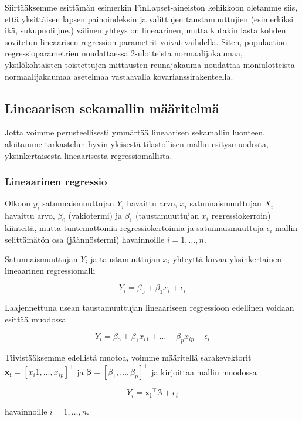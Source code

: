 \documentclass[finnish]{docopts}
\begin{document}
Siirtääksemme \cite{laird82} esittämän esimerkin FinLapset-aineiston kehikkoon oletamme siis, että yksittäisen lapsen painoindeksin ja valittujen taustamuuttujien (esimerkiksi ikä, sukupuoli jne.) välinen yhteys on lineaarinen, mutta kutakin lasta kohden sovitetun lineaarisen regression parametrit voivat vaihdella. Siten, populaation regressioparametrien noudattaessa 2-ulotteista normaalijakaumaa, yksilökohtaisten toistettujen mittausten reunajakauma noudattaa moniulotteista normaalijakaumaa asetelmaa vastaavalla kovarianssirakenteella. 

\subsection{Lineaarisen sekamallin määritelmä}
\label{sub:lsmmaar}

Jotta voimme perusteellisesti ymmärtää lineaarisen sekamallin luonteen, aloitamme tarkastelun hyvin yleisestä tilastollisen mallin esitysmuodosta, yksinkertaisesta lineaarisesta regressiomallista.

\subsubsection{Lineaarinen regressio}
\label{ssb:linreg}

Olkoon $y_i$ satunnaismuuttujan $Y_i$ havaittu arvo, $x_i$ satunnaismuuttujan $X_i$ havaittu arvo, $\beta_0$ (vakiotermi) ja $\beta_1$ (taustamuuttujan $x_i$ regressiokerroin) kiinteitä, mutta tuntemattomia regressiokertoimia ja satunnaismuuttuja $\epsilon_i$ mallin selittämätön osa (jäännöstermi) havainnoille $i = 1,\dots,n$.

Satunnaismuuttujan $Y_i$ ja taustamuuttujan $x_i$ yhteyttä kuvaa yksinkertainen lineaarinen regressiomalli

$$
Y_i = \beta_0 + \beta_1 x_i + \epsilon_i
$$

Laajennettuna usean taustamuuttujan lineaariseen regressioon edellinen voidaan esittää muodossa

$$
Y_i = \beta_0 + \beta_1 x_{i1} + \dots + \beta_p x_{ip} + \epsilon_i
$$

Tiivistääksemme edellistä muotoa, voimme määritellä sarakevektorit $\bm{x_i} = [x_i1 , \dots, x_{ip}]^\top$ ja $\bm{\beta} = [\beta_1 , \dots, \beta_{p}]^\top$ ja kirjoittaa mallin muodossa

$$
Y_i = \bm{x_i}^\top \bm{\beta} + \epsilon_i
$$

havainnoille $i = 1,\dots,n$. \\
\end{document}
